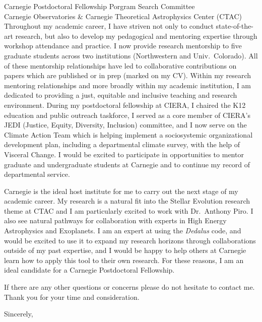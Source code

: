 \documentclass[12pt]{letter}
\begin{document}
\begin{letter}{
               Carnegie Postdoctoral Fellowship Porgram Search Committee \\
               Carnegie Observatories \& Carnegie Theoretical Astrophysics Center (CTAC)
           }
    Throughout my academic career, I have striven not only to conduct state-of-the-art research, but also to develop my pedagogical and mentoring expertise through workshop attendance and practice.
    I now provide research mentorship to five graduate students across two institutions (Northwestern and Univ.~Colorado).
    All of these mentorship relationships have led to collaborative contributions on papers which are published or in prep (marked on my CV).
    Within my research mentoring relationships and more broadly within my academic institution, I am dedicated to providing a just, equitable and inclusive teaching and research environment.
    During my postdoctoral fellowship at CIERA, I chaired the K12 education and public outreach taskforce, I served as a core member of CIERA's JEDI (Justice, Equity, Diversity, Inclusion) committee, and I now serve on the Climate Action Team which is helping implement a sociosystemic organizational development plan, including a departmental climate survey, with the help of Visceral Change.
    I would be excited to participate in opportunities to mentor graduate and undergraduate students at Carnegie and to continue my record of departmental service.

    Carnegie is the ideal host institute for me to carry out the next stage of my academic career.
    My research is a natural fit into the Stellar Evolution research theme at CTAC and I am particularly excited to work with Dr.~Anthony Piro.
    I also see natural pathways for collaboration with experts in High Energy Astrophysics and Exoplanets.
    I am an expert at using the \emph{Dedalus} code, and would be excited to use it to expand my research horizons through collaborations outside of my past expertise, and I would be happy to help others at Carnegie learn how to apply this tool to their own research.
    For these reasons, I am an ideal candidate for a Carnegie Postdoctoral Fellowship.

    If there are any other questions or concerns please do not hesitate to contact me.
    Thank you for your time and consideration.

\closing{Sincerely,}
\vspace{-0.9in}
\\
\end{letter}
\end{document}
